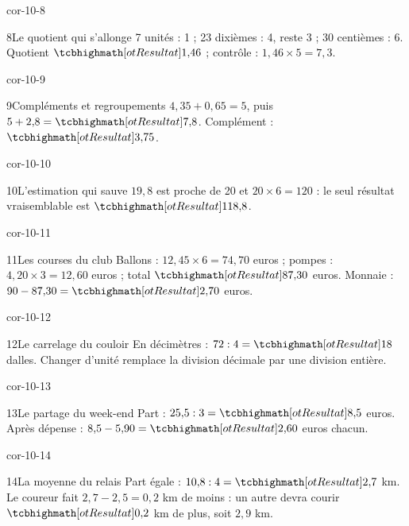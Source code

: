 \begin{blocLivre}{cor-10-8}\begin{corrige}{8}{Le quotient qui s’allonge}
7 unités : 1 ; 23 dixièmes : 4, reste 3 ; 30 centièmes : 6. Quotient $\res{1{,}46}$ ; contrôle : $1{,}46\times5=7{,}3$.
\end{corrige}\end{blocLivre}
\begin{blocLivre}{cor-10-9}\begin{corrige}{9}{Compléments et regroupements}
$4{,}35+0{,}65=5$, puis $5+2{,}8=\res{7{,}8}$. Complément : $\res{3{,}75}$.
\end{corrige}\end{blocLivre}
\begin{blocLivre}{cor-10-10}\begin{corrige}{10}{L’estimation qui sauve}
$19{,}8$ est proche de 20 et $20\times6=120$ : le seul résultat vraisemblable est $\res{118{,}8}$.
\end{corrige}\end{blocLivre}
\begin{blocLivre}{cor-10-11}\begin{corrige}{11}{Les courses du club}
Ballons : $12{,}45\times6=74{,}70$ euros ; pompes : $4{,}20\times3=12{,}60$ euros ; total $\res{87{,}30}$ euros. Monnaie : $90-87{,}30=\res{2{,}70}$ euros.
\end{corrige}\end{blocLivre}
\begin{blocLivre}{cor-10-12}\begin{corrige}{12}{Le carrelage du couloir}
En décimètres : $72:4=\res{18}$ dalles. Changer d’unité remplace la division décimale par une division entière.
\end{corrige}\end{blocLivre}
\begin{blocLivre}{cor-10-13}\begin{corrige}{13}{Le partage du week-end}
Part : $25{,}5:3=\res{8{,}5}$ euros. Après dépense : $8{,}5-5{,}90=\res{2{,}60}$ euros chacun.
\end{corrige}\end{blocLivre}
\begin{blocLivre}{cor-10-14}\begin{corrige}{14}{La moyenne du relais}
Part égale : $10{,}8:4=\res{2{,}7}$ km. Le coureur fait $2{,}7-2{,}5=0{,}2$ km de moins : un autre devra courir $\res{0{,}2}$ km de plus, soit $2{,}9$ km.
\end{corrige}\end{blocLivre}
